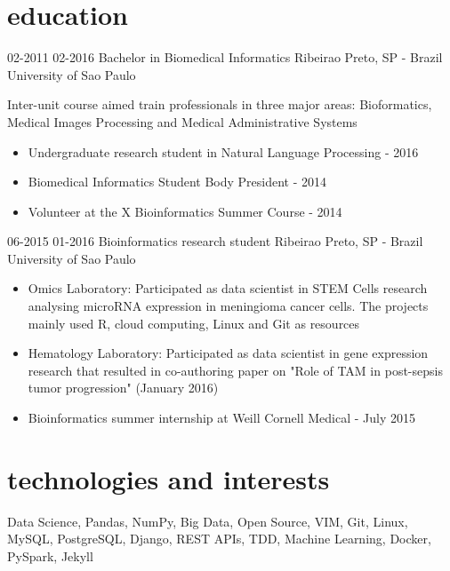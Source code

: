 \documentclass[]{friggeri-cv}
\begin{document}
\section{education}

\begin{entrylist}
  \entrysecondtype
    {02-2011 02-2016}
    {Bachelor in Biomedical Informatics}
    {Ribeirao Preto, SP - Brazil}
    {University of Sao Paulo}
    {Inter-unit course aimed train professionals in three major areas: Bioformatics, Medical Images Processing and Medical Administrative Systems
      \begin{itemize}
        \item Undergraduate research student in Natural Language Processing - 2016
        \item Biomedical Informatics Student Body President - 2014
        \item Volunteer at the X Bioinformatics Summer Course - 2014
      \end{itemize}
    }
\end{entrylist}

\begin{entrylist}
  \entrysecondtype
    {06-2015 01-2016}
    {Bioinformatics research student}
    {Ribeirao Preto, SP - Brazil}
    {University of Sao Paulo}
    {\begin{itemize}
        \item Omics Laboratory: Participated as data scientist in STEM Cells research analysing microRNA expression in meningioma cancer cells. The projects mainly used R, cloud computing, Linux and Git as resources
        \item Hematology Laboratory: Participated as data scientist in gene expression research that resulted in co-authoring paper on "Role of TAM in post-sepsis tumor progression" (January 2016)
        \item Bioinformatics summer internship at Weill Cornell Medical - July 2015
      \end{itemize}
    }
\end{entrylist}

\section{technologies and interests}

\small Data Science, Pandas, NumPy, Big Data, Open Source, VIM, Git, Linux, MySQL, PostgreSQL, Django, REST APIs, TDD, Machine Learning, Docker, PySpark, Jekyll
\end{document}
